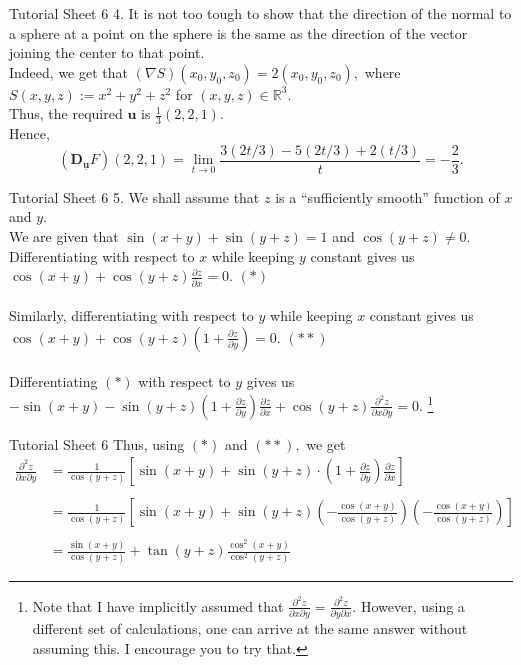 \documentclass[aspectratio=169]{beamer}
\begin{document}
\begin{frame}{Tutorial Sheet 6}
	4. It is not too tough to show that the direction of the normal to a sphere at a point on the sphere is the same as the direction of the vector joining the center to that point. \\
	Indeed, we get that $(\nabla S)(x_0, y_0, z_0) = 2(x_0, y_0, z_0),$ where $S(x, y, z) := x^2 + y^2 + z^2$ for $(x, y, z) \in \mathbb{R}^3.$ \\
	Thus, the required $\mathbf{u}$ is $\frac{1}{3}(2, 2, 1).$ \\
	Hence,
	\begin{equation*}
	    (\mathbf{D_\underline{u}}F)(2, 2, 1) = \lim_{t\to 0}\frac{3(2t/3) - 5(2t/3) + 2(t/3)}{t} = -\frac{2}{3}.
	\end{equation*}
\end{frame}

\begin{frame}{Tutorial Sheet 6}
	5. We shall assume that $z$ is a ``sufficiently smooth'' function of $x$ and $y.$ \\
	We are given that $\sin (x+y)+\sin (y+z)=1$ and $\cos (y+z) \neq 0.$ \\ 
	Differentiating with respect to $x$ while keeping $y$ constant gives us $\cos (x+y)+\cos (y+z) \frac{\partial z}{\partial x}=0.$ \hfill $(*)$ \\~\\
	Similarly, differentiating with respect to $y$ while keeping $x$ constant gives us $\cos (x+y)+\cos (y+z)\left(1+\frac{\partial z}{\partial y}\right)=0.$ \hfill $(**)$ \\~\\
	Differentiating $(*)$ with respect to $y$ gives us $-\sin (x+y) - \sin (y+z) \left( 1 + \frac{\partial z}{\partial y} \right) \frac{\partial z}{\partial x} + \cos (y+z) \frac{\partial^{2} z}{\partial x \partial y} = 0.$
	\footnote{Note that I have implicitly assumed that $\frac{\partial^2z}{\partial x\partial y} = \frac{\partial^2z}{\partial y\partial x}.$ However, using a different set of calculations, one can arrive at the same answer without assuming this. I encourage you to try that.}
\end{frame}

\begin{frame}{Tutorial Sheet 6}
	Thus, using $(*)$ and $(**),$ we get
	\begin{equation*}
	    \begin{aligned}
	        \frac{\partial^{2} z}{\partial x \partial y}
	            &=\frac{1}{\cos (y+z)}\left[\sin (x+y)+\sin (y+z) \cdot\left(1+\frac{\partial z}{\partial y}\right) \frac{\partial z}{\partial x}\right] \\~\\
	            &=\frac{1}{\cos (y+z)}\left[\sin (x+y)+\sin (y+z)\left(-\frac{\cos (x+y)}{\cos (y+z)}\right)\left(-\frac{\cos (x+y)}{\cos (y+z)}\right)\right] \\~\\
	            &=\frac{\sin (x+y)}{\cos (y+z)}+\tan (y+z) \frac{\cos ^{2}(x+y)}{\cos ^{2}(y+z)} 
	    \end{aligned}
	\end{equation*}
\end{frame}
\end{document}
